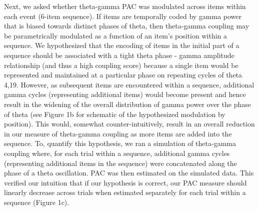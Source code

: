 Next, we asked whether theta-gamma PAC was modulated across items within
each event (6-item sequence). If items are temporally coded by gamma
power that is biased towards distinct phases of theta, then theta-gamma
coupling may be parametrically modulated as a function of an item's
position within a sequence. We hypothesized that the encoding of items
in the initial part of a sequence should be associated with a tight
theta phase - gamma amplitude relationship (and thus a high coupling
score) because a single item would be represented and maintained at a
particular phase on repeating cycles of theta 4,19. However, as
subsequent items are encountered within a sequence, additional gamma
cycles (representing additional items) would become present and hence
result in the widening of the overall distribution of gamma power over
the phase of theta (see Figure 1b for schematic of the hypothesized
modulation by position). This would, somewhat counter-intuitively,
result in an overall reduction in our measure of theta-gamma coupling as
more items are added into the sequence. To, quantify this hypothesis, we
ran a simulation of theta-gamma coupling where, for each trial within a
sequence, additional gamma cycles (representing additional items in the
sequence) were concatenated along the phase of a theta oscillation. PAC
was then estimated on the simulated data. This verified our intuition
that if our hypothesis is correct, our PAC measure should linearly
decrease across trials when estimated separately for each trial within a
sequence (Figure 1c).

